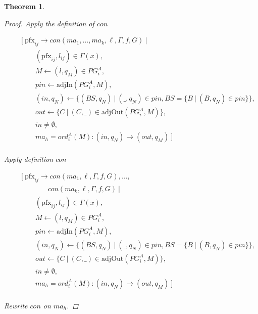\documentclass[twocolumn, openany]{sig-alternate-10pt}
\newcommand{\Pfx}{\mathrm{pfx}}%
\newtheorem{thm}{Theorem}
\begin{document}
\begin{thm}
\begin{proof}
  Apply the definition of $con$

  \[ \begin{array}{l}
     ~~~~~~~~~ [~ \Pfx_{ij} \rightarrow con(ma_1, \dots, ma_k,\ell,\Gamma,f,G) ~\vert~ \\
     ~~~~~~~~~~~~~~~~~~ (\Pfx_{ij},l_{ij}) \in \Gamma(x), \\
     ~~~~~~~~~~~~~~~~~~ M \leftarrow (l,q_M) \in PG^A_i, \\
     ~~~~~~~~~~~~~~~~~~ pin \leftarrow \text{adjIn}(PG^A_i,M), \\
     ~~~~~~~~~~~~~~~~~~ (in,q_N) \leftarrow \{ (BS,q_N) ~\vert~ (\_,q_N) \in pin, BS=\{B ~\vert~ (B,q_N) \in pin \} \}, \\
     ~~~~~~~~~~~~~~~~~~ out \leftarrow \{ C ~\vert~ (C,\_) \in \text{adjOut}(PG^A_i,M) \}, \\
     ~~~~~~~~~~~~~~~~~~ in \neq \emptyset, \\
     ~~~~~~~~~~~~~~~~~~ ma_h = ord^A_i(M) : (in,q_N) \rightarrow (out,q_M) ~] \\
  \end{array} \]%

  Apply definition $con$

  \[ \begin{array}{l}
     ~~~~~~~~~ [~ \Pfx_{ij} \rightarrow con(ma_1,\ell,\Gamma,f,G), \dots, \\ 
     ~~~~~~~~~~~~~~~~~~~~~~~~~~ con(ma_k,\ell,\Gamma,f,G) ~\vert~ \\
     ~~~~~~~~~~~~~~~~~~ (\Pfx_{ij},l_{ij}) \in \Gamma(x), \\
     ~~~~~~~~~~~~~~~~~~ M \leftarrow (l,q_M) \in PG^A_i, \\
     ~~~~~~~~~~~~~~~~~~ pin \leftarrow \text{adjIn}(PG^A_i,M), \\
     ~~~~~~~~~~~~~~~~~~ (in,q_N) \leftarrow \{ (BS,q_N) ~\vert~ (\_,q_N) \in pin, BS=\{B ~\vert~ (B,q_N) \in pin \} \}, \\
     ~~~~~~~~~~~~~~~~~~ out \leftarrow \{ C ~\vert~ (C,\_) \in \text{adjOut}(PG^A_i,M) \}, \\
     ~~~~~~~~~~~~~~~~~~ in \neq \emptyset, \\
     ~~~~~~~~~~~~~~~~~~ ma_h = ord^A_i(M) : (in,q_N) \rightarrow (out,q_M) ~] \\
  \end{array} \]%

  Rewrite $con$ on $ma_h$.


\end{proof}
\end{thm}
\end{document}
